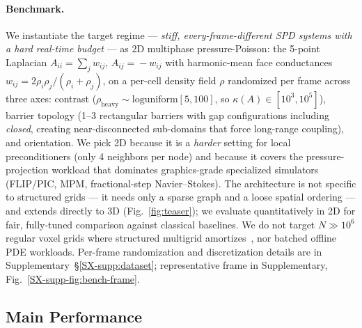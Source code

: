 \documentclass[acmtog,anonymous,review]{acmart}
\theoremstyle{plain}
\begin{document}
\paragraph{Benchmark.}
We instantiate the target regime --- \emph{stiff, every-frame-different SPD systems with
a hard real-time budget} --- as 2D multiphase pressure-Poisson: the 5-point Laplacian
$A_{ii}\!=\!\sum_j w_{ij}$, $A_{ij}\!=\!-w_{ij}$ with harmonic-mean face conductances
$w_{ij}\!=\!2\rho_i\rho_j/(\rho_i\!+\!\rho_j)$, on a per-cell density field $\rho$
randomized per frame across three axes: contrast
($\rho_{\text{heavy}}\!\sim\!\mathrm{loguniform}[5,100]$, so
$\kappa(A)\!\in\![10^3,10^5]$), barrier topology (1--3 rectangular barriers with
gap configurations including \emph{closed}, creating near-disconnected sub-domains that
force long-range coupling), and orientation. We pick 2D because it is a \emph{harder}
setting for local preconditioners (only 4 neighbors per node) and because it covers the
pressure-projection workload that dominates graphics-grade specialized simulators
(FLIP/PIC, MPM, fractional-step Navier--Stokes). The architecture is not specific to
structured grids --- it needs only a sparse graph and a loose spatial ordering --- and
extends directly to 3D (Fig.~\ref{fig:teaser}); we evaluate quantitatively in 2D for
fair, fully-tuned comparison against classical baselines. We do not target
$N\!\gg\!10^6$ regular voxel grids where structured multigrid
amortizes~\cite{Lyu2026multigrid}, nor batched offline PDE workloads. Per-frame
randomization and discretization details are in
Supplementary~\S\ref{SX-supp:dataset}; representative frame in
Supplementary, Fig.~\ref{SX-supp-fig:bench-frame}.

\subsection{Main Performance}
\label{sec:results:perf}
\end{document}
